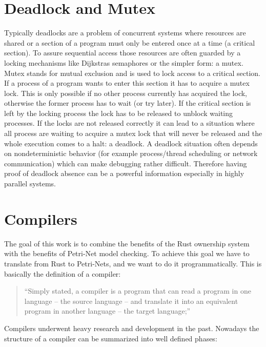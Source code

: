 \section{Deadlock and Mutex}
Typically deadlocks are a problem of concurrent systems where resources are shared or a section of a program must only be entered once at a time (a critical section).
To assure sequential access those resources are often guarded by a locking mechanisms like Dijkstras semaphores\cite{dijkstra1968cooperating} or the simpler form: a mutex.
Mutex stands for mutual exclusion and is used to lock access to a critical section.
If a process of a program wants to enter this section it has to acquire a mutex lock.
This is only possible if no other process currently has acquired the lock, otherwise the former process has to wait (or try later).
If the critical section is left by the locking process the lock has to be released to unblock waiting processes.
If the locks are not released correctly it can lead to a situation where all process are waiting to acquire a mutex lock that will never be released and the whole execution comes to a halt: a deadlock.
A deadlock situation often depends on nondeterministic behavior (for example process/thread scheduling or network communication) which can make debugging rather difficult.
Therefore having proof of deadlock absence can be a powerful information especially in highly parallel systems.

\section{Compilers}
The goal of this work is to combine the benefits of the Rust ownership system with the benefits of Petri-Net model checking.
To achieve this goal we have to translate from Rust to Petri-Nets, 
and we want to do it programmatically.
This is basically the definition of a compiler\cite[Chapter 1.1]{aho1986compilers}:
\begin{quote}
``Simply stated, a compiler is a program that can read a program in one language -- the source language -- and translate it into an equivalent program in another language -- the target language;''
\end{quote}
Compilers underwent heavy research and development in the past.
Nowadays the structure of a compiler can be summarized into well defined phases\cite[Chapter 1.2]{aho1986compilers}:

